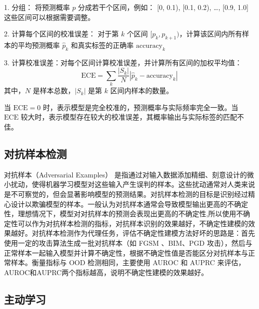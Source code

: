 1. 分组：
   将预测概率 \( p \) 分成若干个区间，例如： [0, 0.1), [0.1, 0.2), \dots, [0.9, 1.0] 这些区间可以根据需要调整。

2. 计算每个区间的校准误差：
   对于第 \( k \) 个区间 \( [p_k, p_{k+1}) \)，计算该区间内所有样本的平均预测概率 \( \hat{p}_k \) 和真实标签的正确率 \( \text{accuracy}_k \)

3. 计算校准误差：对每个区间计算校准误差，并计算所有区间的加权平均值：
\[
   \text{ECE} = \sum_k \frac{|S_k|}{N} | \hat{p}_k - \text{accuracy}_k |
   \]
   其中，\( N \) 是样本总数，\( |S_k| \) 是第 \( k \) 区间内样本的数量。


当 \(\text{ECE} = 0\) 时，表示模型是完全校准的，预测概率与实际频率完全一致。当 \(\text{ECE}\) 较大时，表示模型存在较大的校准误差，其概率输出与实际标签的匹配不佳。





\subsection{对抗样本检测}

对抗样本（Adversarial Examples）\cite{chakraborty2018adversarial} 是指通过对输入数据添加精细、刻意设计的微小扰动，使得机器学习模型对这些输入产生误判的样本。这些扰动通常对人类来说是不可察觉的，但会显著影响模型的预测结果。对抗样本检测的目标是识别经过精心设计以欺骗模型的样本。一般认为对抗样本通常会导致模型输出更高的不确定性，理想情况下，模型对对抗样本的预测会表现出更高的不确定性,所以使用不确定性可以作为对抗样本检测的指标，对抗样本识别的效果越好，不确定性建模的效果越好。对抗样本检测作为代理任务，评估不确定性建模方法好坏的思路是：首先使用一定的攻击算法生成一批对抗样本（如 FGSM\cite{goodfellow2015explaining} 、BIM\cite{kurakin2016adversarial}、PGD\cite{madry2017towards} 攻击），然后与正常样本一起输入模型并计算不确定性，根据不确定性值是否能区分对抗样本与正常样本。衡量指标与 OOD 检测相同，主要使用 AUROC 和 AUPRC 来评估，AUROC和AUPRC两个指标越高，说明不确定性建模的效果越好。

\subsection{主动学习}


